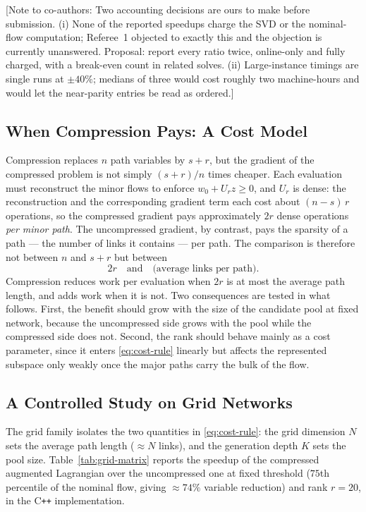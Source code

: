 \documentclass[11pt]{article}
\newcommand{\conote}[1]{{\color{red}\small\textsf{[Note to co-authors: #1]}}}
\begin{document}
\conote{Two accounting decisions are ours to make before submission. (i) None of the reported
speedups charge the SVD or the nominal-flow computation; Referee~1 objected to exactly this
and the objection is currently unanswered. Proposal: report every ratio twice, online-only and
fully charged, with a break-even count in related solves. (ii) Large-instance timings are
single runs at $\pm40\%$; medians of three would cost roughly two machine-hours and would let
the near-parity entries be read as ordered.}


\subsection{When Compression Pays: A Cost Model}
\label{sec:cost-model}


Compression replaces $n$ path variables by $s+r$, but the gradient of the compressed problem
is not simply $(s+r)/n$ times cheaper. Each evaluation must reconstruct the minor flows to
enforce $w_0+U_rz\ge 0$, and $U_r$ is dense: the reconstruction and the corresponding
gradient term each cost about $(n-s)\,r$ operations, so the compressed gradient pays
approximately $2r$ dense operations \emph{per minor path}. The uncompressed gradient, by
contrast, pays the sparsity of a path --- the number of links it contains --- per path. The
comparison is therefore not between $n$ and $s+r$ but between
\begin{equation}
\label{eq:cost-rule}
2r \quad\text{and}\quad \text{(average links per path)} .
\end{equation}
Compression reduces work per evaluation when $2r$ is at most the average path length, and
adds work when it is not. Two consequences are tested in what follows. First, the benefit
should grow with the size of the candidate pool at fixed network, because the uncompressed
side grows with the pool while the compressed side does not. Second, the rank should behave
mainly as a cost parameter, since it enters \eqref{eq:cost-rule} linearly but affects the
represented subspace only weakly once the major paths carry the bulk of the flow.


\subsection{A Controlled Study on Grid Networks}
\label{sec:grid-study}


The grid family isolates the two quantities in \eqref{eq:cost-rule}: the grid dimension $N$
sets the average path length ($\approx N$ links), and the generation depth $K$ sets the pool
size. Table~\ref{tab:grid-matrix} reports the speedup of the compressed augmented Lagrangian
over the uncompressed one at fixed threshold ($75$th percentile of the nominal flow, giving
$\approx 74\%$ variable reduction) and rank $r=20$, in the C\texttt{++} implementation.
\end{document}
